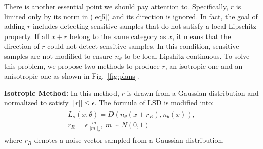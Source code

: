 \documentclass[journal,twocolumn]{IEEEtran}
\theoremstyle{definition}
\begin{document}
There is another essential point we should pay attention to. Specifically, $r$ is limited only by its norm in (\ref{eq5}) and its direction is ignored. In fact, the goal of adding $r$ includes detecting sensitive samples that do not satisfy a local Lipschitz property. If all $x+r$ belong to the same category as $x$, it means that the direction of $r$ could not detect sensitive samples. In this condition, sensitive samples are not modified to ensure $n_{\theta}$ to be local Lipshitz continuous. To solve this problem, we propose two methods to produce $r$, an isotropic one and an anisotropic one as shown in Fig.~\ref{fig:plans}.

{\bf Isotropic Method:} In this method, $r$ is drawn from a Gaussian distribution and normalized to satisfy $||r||\leq\epsilon$. The formula of LSD is modified into:
\begin{align}
\begin{gathered}
L_s(x,\theta)=D(n_\theta(x+r_{R}),n_\theta(x)),\\
r_{R}=\epsilon\frac{m}{||m||_2},\;m\sim N(0,1)\label{eq6}
\end{gathered}
\end{align}
where $r_{R}$ denotes a noise vector sampled from a Gaussian distribution.
\end{document}

